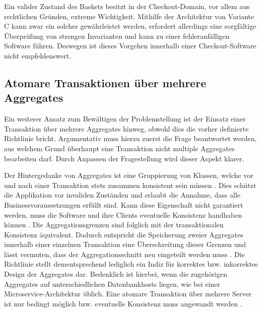Ein valider Zustand des Baskets besitzt in der Checkout-Domain, vor allem aus rechtlichen Gründen, extreme Wichtigkeit. Mithilfe der Architektur von Variante C kann zwar ein solcher gewährleistet werden, erfordert allerdings eine sorgfältige Überprüfung von strengen Invarianten und kann zu einer fehleranfälligen Software führen. Deswegen ist dieses Vorgehen innerhalb einer Checkout-Software nicht empfehlenswert.

\subsection{Atomare Transaktionen über mehrere Aggregates}

Ein weiterer Ansatz zum Bewältigen der Problemstellung ist der Einsatz einer Transaktion über mehrere Aggregates hinweg, obwohl dies die vorher definierte Richtlinie bricht. Argumentativ muss hierzu zuerst die Frage beantwortet werden, aus welchem Grund überhaupt eine Transaktion nicht multiple Aggregates bearbeiten darf. Durch Anpassen der Fragestellung wird dieser Aspekt klarer. 

Der Hintergedanke von Aggregates ist eine Gruppierung von Klassen, welche vor und nach einer Transaktion stets zusammen konsistent sein müssen \cite[S. 128f.]{Evans.2011}. Dies schützt die Applikation vor invaliden Zuständen und erlaubt die Annahme, dass alle Businessvoraussetzungen erfüllt sind. Kann diese Eigenschaft nicht garantiert werden, muss die Software und ihre Clients eventuelle Konsistenz handhaben können \cite[S. 364]{Vernon.2015}. Die Aggregationsgrenzen sind folglich mit der transaktionalen Konsistenz äquivalent. Dadurch entspricht die Speicherung zweier Aggregates innerhalb einer einzelnen Transaktion eine Überschreitung dieser Grenzen und lässt vermuten, dass der Aggregationsschnitt neu eingeteilt werden muss \cite[S. 358f.]{Vernon.2015}. Die Richtlinie stellt dementsprechend lediglich ein Indiz für korrektes bzw. inkorrektes Design der Aggregates dar. Bedenklich ist hierbei, wenn die zugehörigen Aggregates auf unterschiedlichen Datenbankhosts liegen, wie bei einer Microservice-Architektur üblich. Eine atomare Transaktion über mehrere Server ist nur bedingt möglich bzw. eventuelle Konsistenz muss angewandt werden \cite{Fowler.2014}.

